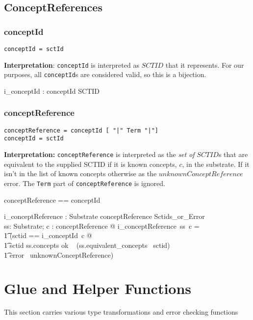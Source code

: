 \documentclass{article}
\def\spec#1{{\tt #1}}
\begin{document}
\subsection{ConceptReferences}
\subsubsection{conceptId}
\begin{verbatim}
conceptId = sctId
\end{verbatim}
\textbf{Interpretation}: \spec{conceptId} is interpreted as $SCTID$ that it represents.  For our purposes, all \spec{conceptId}s are considered valid, so this is a bijection.
\begin{zed}
[conceptId]
\end{zed}

\begin{gendef}
   i\_conceptId : conceptId \bij SCTID
\end{gendef}

\subsubsection{conceptReference}
\begin{verbatim}
conceptReference = conceptId [ "|" Term "|"]
conceptId = sctId
\end{verbatim}
\textbf{Interpretation:}  \spec{conceptReference} is interpreted as the \emph{set of} $SCTID$s that are equivalent to the supplied SCTID if it is known concepts, $c$,
in the substrate.  If it isn't in the list of known concepts otherwise as the $unknownConceptReference$ error.  The \spec{Term} part of \spec{conceptReference} is ignored.

\begin{zed}
conceptReference == conceptId
\end{zed}

\begin{gendef}
   i\_conceptReference : Substrate \fun conceptReference \fun Sctids\_or\_Error \\
\where
   \forall ss: Substrate; c : conceptReference @ i\_conceptReference~ss~c = \\
\t1 (\LET sctid == i\_conceptId~c @ \\
\t1 \IF sctid \in ss.concepts \THEN ok ~ (ss.equivalent\_concepts~ sctid) \\
\t1 \ELSE error~ unknownConceptReference)
\end{gendef}

\section{Glue and Helper Functions}
This section carries various type transformations and error checking functions
\end{document}
